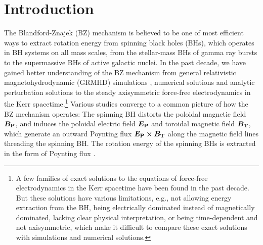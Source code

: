 \documentclass[iop,apj]{emulateapj}
\begin{document}

\bigskip\bigskip

\section{Introduction}
The Blandford-Znajek (BZ) mechanism \citep{Blandford1977} is believed to be one of most efficient ways
to extract rotation energy from spinning black holes (BHs), which operates in BH
systems on all mass scales, from the stellar-mass BHs of gamma ray bursts to the
supermassive BHs of active galactic nuclei. In the past decade, we have gained
better understanding of the BZ mechanism from general relativistic
magnetohydrodynamic (GRMHD) simulations \citep[e.g.][]{Komissarov2001, Komissarov2004e,
Komissarov2004, Komissarov2005, Semenov2004, McKinney2004, McKinney2005, McKinney2007a,
McKinney2007b, Komissarov2007, Tchekhovskoy2008, Tchekhovskoy2010, Tchekhovskoy2011,
Palenzuela2011, Alic2012, Tchekhovskoy2012, Penna2013, McKinney2013}, numerical
solutions \citep[e.g.][]{Fendt1997, Udensky2004, Udensky2005, Palenzuela2010,
Contopoulos2013, Nathanail2014} and analytic perturbation solutions \citep[e.g.][]{Tanabe2008,
Beskin2013, Pan2014, Pan2015b, Pan2015, Pan2016, Gralla2014, Gralla2015, Gralla2016a,
Yang2015, Penna2015} to the steady axisymmetric force-free electrodynamics in the Kerr
spacetime.\footnote{A few families of exact solutions \citep[e.g.][]{Menon2005, Menon2007,
Menon2011, Brennan2013, Menon2015, Compere2016} to the equations of force-free electrodynamics
in the Kerr spacetime  have been found in the past decade. But these solutions
have various limitations, e.g., not allowing energy extraction from the BH,
being electrically dominated instead of magnetically dominated, lacking clear
physical interpretation, or being time-dependent and not axisymmetric, which
make it difficult to compare these exact solutions with simulations and
numerical solutions.} Various studies converge to a common picture of how the BZ mechanism operates:
The spinning BH distorts the poloidal magnetic field $\bm{B_{\rm P}}$, and induces the poloidal electric field $\bm{E_{\rm P}}$
and toroidal magnetic field $\bm{B_{\rm T}}$,
which generate an outward Poynting flux $\bm{E_{\rm P}
\times B_{\rm T} }$  along the magnetic field lines threading the spinning BH.
The rotation energy of the spinning BHs is extracted in the form of Poynting flux
\citep{Komissarov2009, Beskin2010}.
\end{document}
